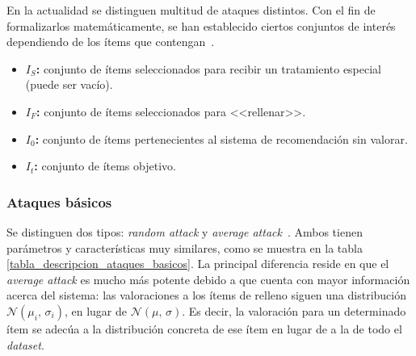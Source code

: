 En la actualidad se distinguen multitud de ataques distintos. Con el fin de formalizarlos matemáticamente, se han establecido ciertos conjuntos de interés dependiendo de los ítems que contengan~\cite{zhou2021SemisupervisedRecommendationAttack}.

\begin{itemize}
	
	\item \textbf{$I_S$:} conjunto de ítems seleccionados para recibir un tratamiento especial (puede ser vacío).
	\item \textbf{$I_F$:} conjunto de ítems seleccionados para <<rellenar>>.
	\item \textbf{$I_0$:} conjunto de ítems pertenecientes al sistema de recomendación sin valorar.
	\item \textbf{$I_t$:} conjunto de ítems objetivo.
	
\end{itemize}


\subsubsection{Ataques básicos}

Se distinguen dos tipos: \textit{random attack} y \textit{average attack}~\cite{mingdan2018ShillingAttacksAReview}. Ambos tienen parámetros y características muy similares, como se muestra en la tabla \ref{tabla_descripcion_ataques_basicos}. La principal diferencia reside en que el \textit{average attack} es mucho más potente debido a que cuenta con mayor información acerca del sistema: las valoraciones a los ítems de relleno siguen una distribución $\mathcal{N}(\mu_i,\,\sigma_i)$, en lugar de $\mathcal{N}(\mu,\,\sigma)$. Es decir, la valoración para un determinado ítem se adecúa a la distribución concreta de ese ítem en lugar de a la de todo el \textit{dataset}.



